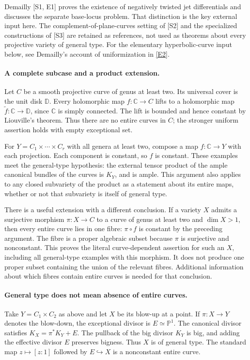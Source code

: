 \documentclass[11pt]{article}
\begin{document}
Demailly [S1, E1] proves the existence of negatively twisted jet
differentials and discusses the separate base-locus problem. That
distinction is the key external input here. The complement-of-plane-curves
setting of [S2] and the specialized constructions of [S3] are retained
as references, not used as theorems about every projective variety of
general type. For the elementary hyperbolic-curve input below, see
Demailly's account of uniformization in
\href{https://www-fourier.ujf-grenoble.fr/~demailly/manuscripts/viasm2012expanded.pdf}{[E2]}.

\paragraph{A complete subcase and a product extension.}
Let $C$ be a smooth projective curve of genus at least two. Its universal
cover is the unit disk $\mathbb D$. Every holomorphic map
$f:\mathbb C\to C$ lifts to a holomorphic map
$\widetilde f:\mathbb C\to\mathbb D$, since $\mathbb C$ is simply
connected. The lift is bounded and hence constant by Liouville's theorem.
Thus there are no entire curves in $C$; the stronger uniform assertion
holds with empty exceptional set.

For $Y=C_1\times\cdots\times C_r$ with all genera at least two,
compose a map $f:\mathbb C\to Y$ with each projection. Each component
is constant, so $f$ is constant. These examples meet the general-type
hypothesis: the external tensor product of the ample canonical bundles
of the curves is $K_Y$, and is ample. This argument also applies to
any closed subvariety of the product as a statement about its entire
maps, whether or not that subvariety is itself of general type.

There is a useful extension with a different conclusion. If a variety
$X$ admits a surjective morphism $\pi:X\to C$ to a curve of genus at
least two and $\dim X>1$, then every entire curve lies in one fibre:
$\pi\circ f$ is constant by the preceding argument. The fibre is a
proper algebraic subset because $\pi$ is surjective and nonconstant.
This proves the literal curve-dependent assertion for such an $X$,
including all general-type examples with this morphism. It does not
produce one proper subset containing the union of the relevant fibres.
Additional information about which fibres contain entire curves is
needed for that conclusion.

\paragraph{General type does not mean absence of entire curves.}
Take $Y=C_1\times C_2$ as above and let $X$ be its blow-up at a point.
If $\pi:X\to Y$ denotes the blow-down, the exceptional divisor is
$E\simeq\mathbb P^1$. The canonical divisor satisfies
$K_X=\pi^*K_Y+E$. The pullback of the big divisor $K_Y$ is big, and
adding the effective divisor $E$ preserves bigness. Thus $X$ is of
general type. The standard map $z\mapsto[z:1]$ followed by
$E\hookrightarrow X$ is a nonconstant entire curve.
\end{document}
